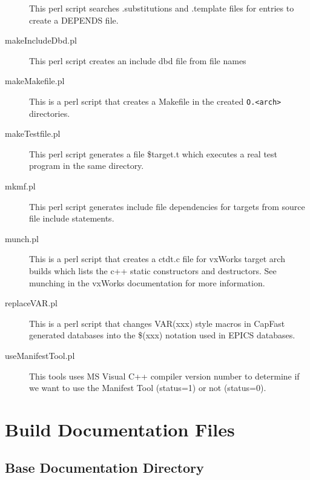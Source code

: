 \begin{description}
This perl script searches .substitutions and .template files for entries to create a DEPENDS file.

\item[makeIncludeDbd.pl]

This perl script creates an include dbd file from file names

\item[makeMakefile.pl]

This is a perl script that creates a Makefile in the created \verb|O.<arch>| directories.

\item[makeTestfile.pl]

This perl script generates a file \$target.t which executes a real test program in the same directory.

\item[mkmf.pl]

This perl script generates include file dependencies for targets from source file include statements.

\item[munch.pl]

This is a perl script that creates a ctdt.c file for vxWorks target arch builds which lists the c++ static constructors 
and destructors. See munching in the vxWorks documentation for more information.

\item[replaceVAR.pl]

This is a perl script that changes VAR(xxx) style macros in CapFast generated databases into the \$(xxx) notation 
used in EPICS databases.

\item[useManifestTool.pl]

This tools uses MS Visual C++ compiler version number to determine if we want to use the Manifest Tool 
(status=1) or not (status=0).

\end{description}

\section{Build Documentation Files}

\subsection{Base Documentation Directory}


